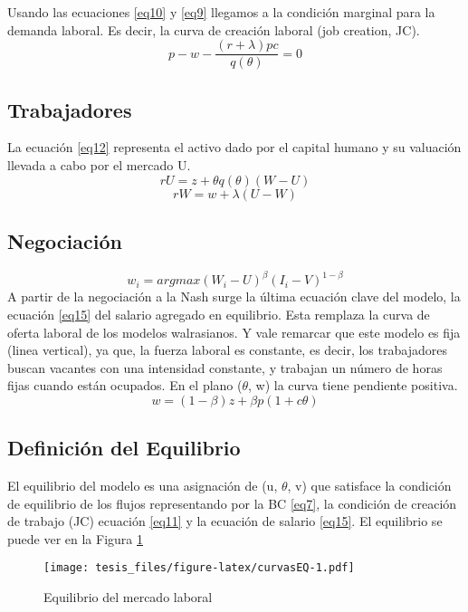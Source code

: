 \documentclass[12pt,oneside]{reedthesis}
\makeatletter
\def\maxwidth{ %
  \ifdim\Gin@nat@width>\linewidth
    \linewidth
  \else
    \Gin@nat@width
  \fi
}
\makeatother
\begin{document}
Usando las ecuaciones \eqref{eq10} y \eqref{eq9} llegamos a la condición marginal para la demanda laboral. Es decir, la curva de creación laboral (job creation, JC).
\begin{equation} \label{eq11}
p - w  - \frac{(r+\lambda)pc}{q(\theta)} = 0
\end{equation}
\subsection{Trabajadores}

La ecuación \eqref{eq12} representa el activo dado por el capital humano y su valuación llevada a cabo por el mercado U.
\begin{equation} \label{eq12}
rU = z + \theta q(\theta)(W-U)
\end{equation}
\begin{equation} \label{eq13}
rW = w + \lambda(U-W)
\end{equation}
\subsection{Negociación}
\begin{equation} \label{eq14}
w_i = argmax (W_{i} - U)^{\beta} (I_{i}-V)^{1-\beta}
\end{equation}
A partir de la negociación a la Nash surge la última ecuación clave del modelo, la ecuación \eqref{eq15} del salario agregado en equilibrio. Esta remplaza la curva de oferta laboral de los modelos walrasianos. Y vale remarcar que este modelo es fija (linea vertical), ya que, la fuerza laboral es constante, es decir, los trabajadores buscan vacantes con una intensidad constante, y trabajan un número de horas fijas cuando están ocupados. En el plano (\(\theta\), w) la curva tiene pendiente positiva.
\begin{equation} \label{eq15}
w = (1 - \beta)z + \beta p(1 + c\theta)
\end{equation}
\subsection{Definición del Equilibrio}

El equilibrio del modelo es una asignación de (u, \(\theta\), v) que satisface la condición de equilibrio de los flujos representando por la BC \eqref{eq7}, la condición de creación de trabajo (JC) ecuación \eqref{eq11} y la ecuación de salario \eqref{eq15}. El equilibrio se puede ver en la Figura \ref{fig:curvasEQ}
\begin{figure}
\texttt{[image: tesis\_files/figure-latex/curvasEQ-1.pdf]}
\caption{Equilibrio del mercado laboral}\label{fig:curvasEQ}\textsc{}

\end{figure}
\newpage
\end{document}
